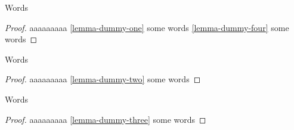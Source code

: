 \begin{lemma}
\label{lemma-dummy-two}
Words
\end{lemma}

\begin{proof}
aaaaaaaaa \ref{lemma-dummy-one} some words
    \ref{lemma-dummy-four} some words
\end{proof}

\begin{lemma}
\label{lemma-dummy-three}
Words
\end{lemma}

\begin{proof}
aaaaaaaaa \ref{lemma-dummy-two} some words
\end{proof}

\begin{lemma}
\label{lemma-dummy-four}
Words
\end{lemma}

\begin{proof}
aaaaaaaaa \ref{lemma-dummy-three} some words
\end{proof}
